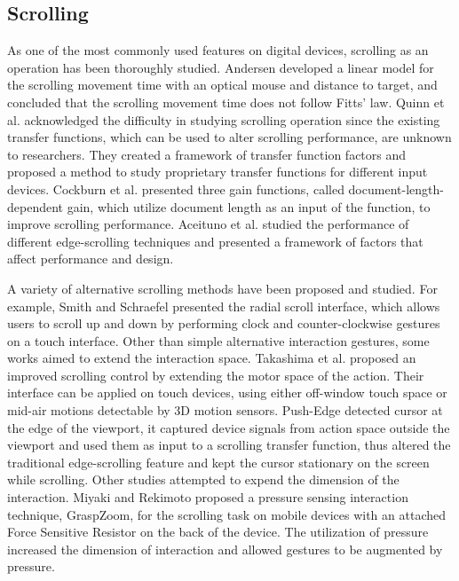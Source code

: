 \documentclass{sigchi}
\begin{document}
\subsection{Scrolling}
As one of the most commonly used features on digital devices, scrolling as an operation has been thoroughly studied. Andersen \cite{andersen2005simple} developed a linear model for the scrolling movement time with an optical mouse and distance to target, and concluded that the scrolling movement time does not follow Fitts' law. Quinn et al. \cite{quinn2012exposing} acknowledged the difficulty in studying scrolling operation since the existing transfer functions, which can be used to alter scrolling performance, are unknown to researchers. They created a framework of transfer function factors and proposed a method to study proprietary transfer functions for different input devices. Cockburn et al. \cite{cockburn2012improving} presented three gain functions, called document-length-dependent gain, which utilize document length as an input of the function, to improve scrolling performance. Aceituno et al. \cite{aceituno2017design} studied the performance of different edge-scrolling techniques and presented a framework of factors that affect performance and design.  

A variety of alternative scrolling methods have been proposed and studied. For example, Smith and Schraefel \cite{smith2004radial} presented the radial scroll interface, which allows users to scroll up and down by performing clock and counter-clockwise gestures on a touch interface. Other than simple alternative interaction gestures, some works aimed to extend the interaction space. Takashima et al. \cite{takashima2015exploring} proposed an improved scrolling control by extending the motor space of the action. Their interface can be applied on touch devices, using either off-window touch space or mid-air motions detectable by 3D motion sensors. Push-Edge \cite{malacria2015push} detected cursor at the edge of the viewport, it captured device signals from action space outside the viewport and used them as input to a scrolling transfer function, thus altered the traditional edge-scrolling feature and kept the cursor stationary on the screen while scrolling. Other studies attempted to expend the dimension of the interaction. Miyaki and Rekimoto \cite{miyaki2009graspzoom} proposed a pressure sensing interaction technique, GraspZoom, for the scrolling task on mobile devices with an attached Force Sensitive Resistor on the back of the device. The utilization of pressure increased the dimension of interaction and allowed gestures to be augmented by pressure.  
\end{document}
